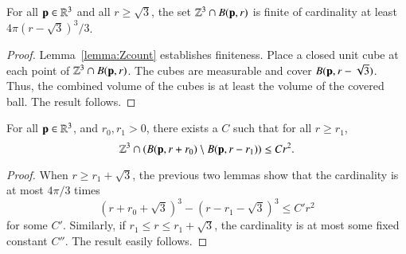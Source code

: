 \begin{lemma}[]
\label{lemma:Zlow-count}
For all ${\mathbf p}\in\mathbb{R}^3$ and all $r\ge\sqrt3$, the set
$\mathbb{Z}^3\cap B({\mathbf p},r)$ is finite of cardinality at least
$4\pi (r-\sqrt3)^3/3$.
\end{lemma}

\begin{proof} Lemma~\ref{lemma:Zcount} establishes finiteness.  Place
a closed unit cube at each point of $\mathbb{Z}^3\cap B({\mathbf p},r)$.  The
cubes are measurable and cover $B({\mathbf p},r-\sqrt3)$.  Thus, the combined
volume of the cubes is at least the volume of the covered ball.  The
result follows.
\end{proof}

\begin{lemma}
\label{lemma:Zr2}
For all ${\mathbf p}\in\mathbb{R}^3$, and $r_0,r_1>0$, there exists a $C$ such
that for all $r\ge r_1$, 
\begin{displaymath}
\mathbb{Z}^3 \cap (B({\mathbf p},r+r_0) \setminus B({\mathbf p},r-r_1)) \le C r^2.
\end{displaymath}
\end{lemma}

\begin{proof}  When $r \ge r_1+\sqrt3$, the previous two lemmas show
that the cardinality is at most $4\pi/3$ times
\begin{displaymath}
(r +r_0 + \sqrt3)^3 - (r - r_1 - \sqrt3)^3 \le C' r^2
\end{displaymath}
for some $C'$.  Similarly, if $r_1\le r\le r_1+\sqrt3$, the
cardinality is at most some fixed constant $C''$.  The result
easily follows.
\end{proof}

